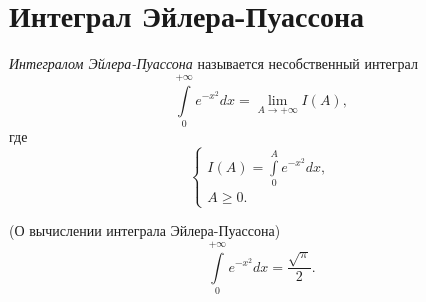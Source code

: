 \documentclass[../../main.tex]{subfiles}
\begin{document}
\section{Интеграл Эйлера-Пуассона}
	\begin{defn}
		\emph{Интегралом Эйлера-Пуассона} называется несобственный интеграл 
		\begin{equation}
		 	\label{lec17:1}
            \int\limits_0^{+\infty}e^{-x^2}dx = \lim\limits_{A\to +\infty} I(A),
		\end{equation}
        где
		\begin{equation}
		 	\label{lec17:2}
            \begin{cases}
                I(A) = \int\limits_0^{A}e^{-x^2}dx, \\
                A \geq 0.
            \end{cases}
		\end{equation}
        \end{defn}
		
		\begin{theorem}
		 (О вычислении интеграла Эйлера-Пуассона)
		 \begin{equation}
          \label{lec17:3}
		  \int\limits_0^{+\infty}e^{-x^2}dx = \frac{\sqrt{\pi}}{2}.
		 \end{equation}

		\end{theorem}
		
\end{document}
